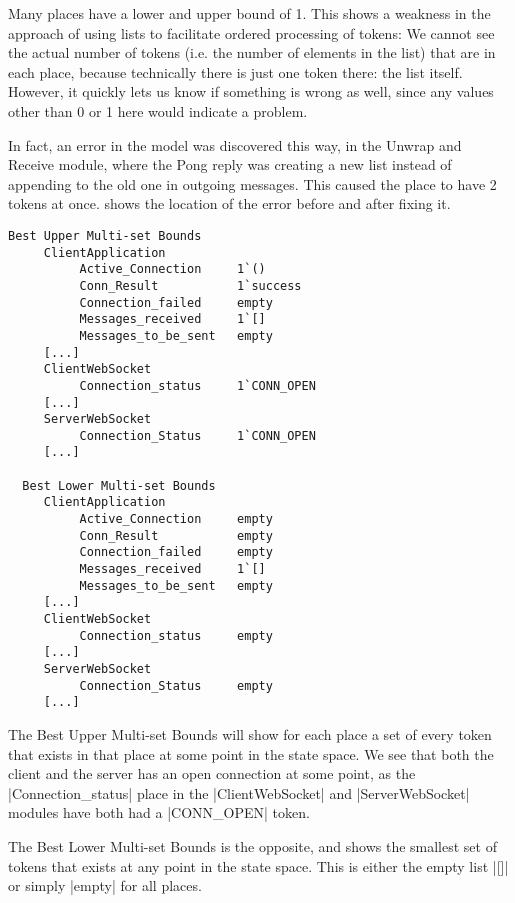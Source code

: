 	Many places have a lower and upper bound of 1. This shows a weakness
	in the approach of using lists to facilitate ordered processing of tokens: We
	cannot see the actual number of tokens (i.e. the number of elements in the
	list) that are in each place, because technically there is just one token
	there: the list itself.
	However, it quickly lets us know if something is wrong as well, since any
	values other than 0 or 1 here would indicate a problem. 
	
	In fact, an error in the model was discovered this way, in the Unwrap and
	Receive module, where the Pong reply was creating a new list instead of
	appending to the old one in outgoing messages. This caused the  place to have 2 tokens at once.  shows the
	location of the error before and after fixing it.
	
	\begin{lstlisting}[language={},tabsize=4,float]
  Best Upper Multi-set Bounds
     ClientApplication
          Active_Connection		1`()
          Conn_Result			1`success
          Connection_failed		empty
          Messages_received		1`[]
          Messages_to_be_sent	empty
     [...]
     ClientWebSocket
          Connection_status		1`CONN_OPEN
     [...]
     ServerWebSocket
          Connection_Status		1`CONN_OPEN
     [...]

  Best Lower Multi-set Bounds
     ClientApplication
          Active_Connection		empty
          Conn_Result			empty
          Connection_failed		empty
          Messages_received		1`[]
          Messages_to_be_sent	empty
     [...]
     ClientWebSocket
          Connection_status		empty
     [...]
     ServerWebSocket
          Connection_Status		empty
     [...]
	\end{lstlisting}
	
	The Best Upper Multi-set Bounds will show for each place a set of every token
	that exists in that place at some point in the state space. We see that both
	the client and the server has an open connection at some point, as the
	|Connection_status| place in the |ClientWebSocket| and |ServerWebSocket|
	modules have both had a |CONN_OPEN| token.
	
	The Best Lower Multi-set Bounds is the opposite, and shows the smallest set of
	tokens that exists at any point in the state space. This is either the empty
	list |[]| or simply |empty| for all places.
	
